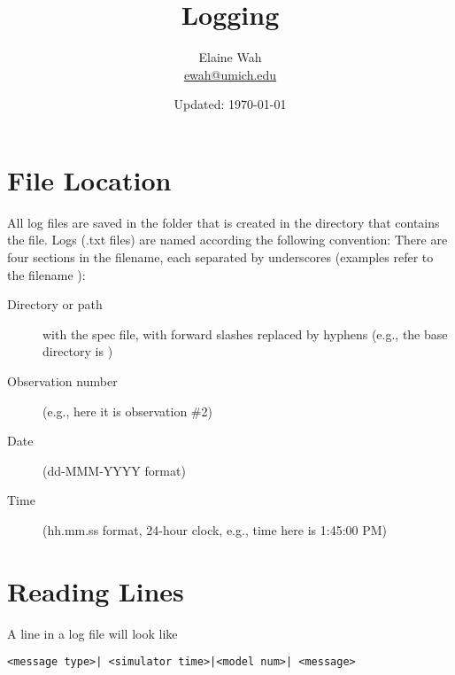 \documentclass[11pt]{article}
\begin{document}
	
\title{Logging}
\author{
  Elaine Wah \\
  \href{mailto:ewah@umich.edu}{ewah@umich.edu}
}
\date{Updated: \today}
\maketitle

\section{File Location}

All log files are saved in the folder  that is created in the
directory that contains the  file.  Logs (.txt
files) are named according the following convention: There are four sections in
the filename, each separated by underscores (examples refer to the filename
):

\begin{description}
\item[Directory or path] with the spec file, with forward slashes replaced by
  hyphens (e.g., the base directory is )
\item[Observation number] (e.g., here it is observation \#2)
\item[Date] (dd-MMM-YYYY format)
\item[Time] (hh.mm.ss format, 24-hour clock, e.g., time here is 1:45:00 PM)
\end{description}

\section{Reading Lines}

A line in a log file will look like

\begin{verbatim}
<message type>| <simulator time>|<model num>| <message>
\end{verbatim}
\end{document}
